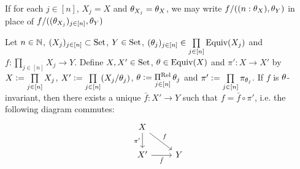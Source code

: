 \begin{note}
	If for each $j \in [n]$, $X_j = X$ and $\theta_{X_j} = \theta_X$, we may write $f/((n:\theta_X), \theta_Y)$ in place of $f/((\theta_{X_j})_{j \in [n]}, \theta_Y)$
\end{note}

\begin{ex}
	Let $n \in \mathbb{N}$, $(X_j)_{j \in [n]} \subset \text{Set}$, $Y \in \text{Set}$, $(\theta_j)_{j \in [n]} \in \prod\limits_{j \in [n]} \operatorname*{\text{Equiv}}(X_j)$ and $f: \prod\limits_{j \in [n]} X_j \rightarrow Y$. Define $X, X' \in \text{Set}$, $\theta \in \operatorname*{\text{Equiv}}(X)$ and $\pi':X \rightarrow X'$ by $X \vcentcolon= \prod\limits_{j \in [n]} X_j$, $X' \vcentcolon= \prod\limits_{j \in [n]} (X_j/\theta_j)$, $\theta \vcentcolon= \operatorname*{\Pi^{\text{Rel}}}\limits_{j \in [n]} \theta_j$ and $\pi' \vcentcolon= \prod\limits_{j \in [n]} \pi_{\theta_j}$. If $f$ is $\theta$-invariant, then there exists a unique $\bar{f}:X' \rightarrow Y$ such that $f = \bar{f} \circ \pi'$, i.e. the following diagram commutes:
	\[ 
	\begin{tikzcd}
		X  \arrow[dr, "f"]  \arrow[d, "\pi'"']  & \\
		X' \arrow[r, "\bar{f}"'] &  Y  \\
	\end{tikzcd}
	\]
\end{ex}


